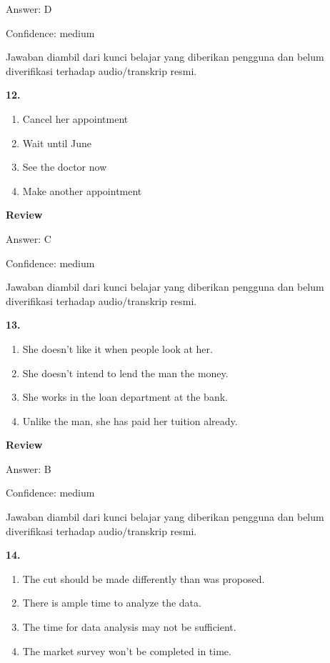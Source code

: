 \documentclass[12pt]{article}
\begin{document}
Answer: D\par
Confidence: medium\par
Jawaban diambil dari kunci belajar yang diberikan pengguna dan belum diverifikasi terhadap audio/transkrip resmi.\par
\endgroup
\par
\vspace{0.25\baselineskip}
\noindent\textbf{12.}
\begin{enumerate}[label=(\Alph*),leftmargin=*,itemsep=0.2em]
\item Cancel her appointment
\item Wait until June
\item See the doctor now
\item Make another appointment
\end{enumerate}
\par
\begingroup
\setlength{\parskip}{0pt}
\setlength{\parindent}{0pt}
\textbf{Review}\par
Answer: C\par
Confidence: medium\par
Jawaban diambil dari kunci belajar yang diberikan pengguna dan belum diverifikasi terhadap audio/transkrip resmi.\par
\endgroup
\par
\vspace{0.25\baselineskip}
\noindent\textbf{13.}
\begin{enumerate}[label=(\Alph*),leftmargin=*,itemsep=0.2em]
\item She doesn't like it when people look at her.
\item She doesn't intend to lend the man the money.
\item She works in the loan department at the bank.
\item Unlike the man, she has paid her tuition already.
\end{enumerate}
\par
\begingroup
\setlength{\parskip}{0pt}
\setlength{\parindent}{0pt}
\textbf{Review}\par
Answer: B\par
Confidence: medium\par
Jawaban diambil dari kunci belajar yang diberikan pengguna dan belum diverifikasi terhadap audio/transkrip resmi.\par
\endgroup
\par
\vspace{0.25\baselineskip}
\noindent\textbf{14.}
\begin{enumerate}[label=(\Alph*),leftmargin=*,itemsep=0.2em]
\item The cut should be made differently than was proposed.
\item There is ample time to analyze the data.
\item The time for data analysis may not be sufficient.
\item The market survey won't be completed in time.
\end{enumerate}
\end{document}
